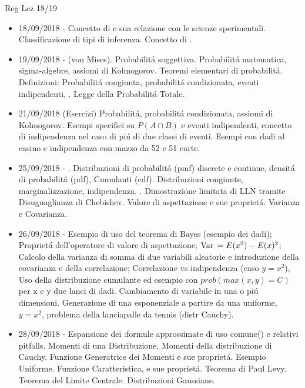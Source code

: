 
\begin{frame}[allowframebreaks]{Reg Lez 18/19}
\cite{reg18}
\begin{itemize}
    \item 18/09/2018 - Concetto di  e sua relazione con le scienze sperimentali. Classificazione di tipi di inferenza. Concetto di .
    
    \item 19/09/2018 -  (von Mises). Probabilit\'a soggettiva. Probabilit\'a matematica, sigma-algebre, assiomi di Kolmogorov. Teoremi elementari di probabilit\'a. Definizioni: Probabilit\'a congiunta, probabilit\'a condizionata, eventi indipendenti, . Legge della Probabilit\'a Totale.
    
    \item 21/09/2018 (Esercizi) Probabilit\'a, probabilit\'a condizionata, assiomi di Kolmogorov. Esempi specifici su $P(A \cap B)$ e eventi indipendenti, concetto di indipendenza nel caso di pi\'u di due classi di eventi. Esempi con dadi al casino e indipendenza con mazzo da 52 e 51 carte.
    
    \item 25/09/2018 - . Distribuzioni di probabilit\'a (pmf) discrete e continue, densit\'a di probabilit\'a (pdf), Cumulanti (cdf). Distribuzioni congiunte, marginalizzazione, indipendenza. . Dimostrazione limitata di LLN tramite Disuguaglianza di Chebishev. Valore di aspettazione e sue propriet\'a. Varianza e Covarianza.
    
    \item 26/09/2018 - Esempio di uso del teorema di Bayes (esempio dei dadi); Propriet\'a dell'operatore di valore di aspettazione; $\operatorname{Var}{}=E(x^2)-E(x)^2$; Calcolo della varianza di somma di due variabili aleatorie e introduzione della covarianza e della correlazione; Correlazione vs indipendenza (caso $y=x^2$), Uso della distribuzione cumulante ed esempio con $prob(max(x,y)=C)$ per x e y due lanci di dadi. Cambiamento di variabile in una o pi\'u dimensioni. Generazione di una esponenziale a partire da una uniforme, $y=x^2$, problema della lanciapalle da tennis (distr Cauchy).
    
    \item 28/09/2018 - Espansione dei :formule approssimate di uso comune() e relativi pitfalls. Momenti di una Distribuzione. Momenti della distribuzione di Cauchy. Funzione Generatrice dei Momenti e sue propriet\'a. Esempio Uniforme. Funzione Caratteristica, e sue propriet\'a. Teorema di Paul Levy. Teorema del Limite Centrale. Distribuzioni Gaussiane.
    

\end{itemize}
\end{frame}
